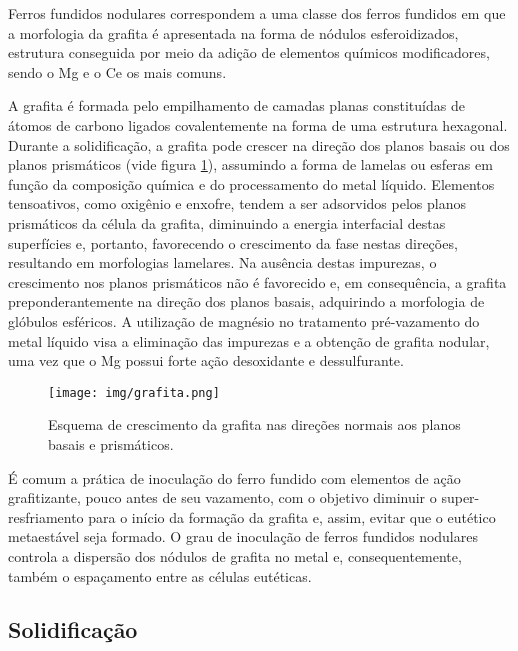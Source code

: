 Ferros fundidos nodulares correspondem a uma classe dos ferros fundidos em que a morfologia da grafita é apresentada na forma de nódulos esferoidizados, estrutura conseguida por meio da adição de elementos químicos modificadores, sendo o Mg e o Ce os mais comuns.

A grafita é formada pelo empilhamento de camadas planas constituídas de átomos de carbono ligados covalentemente na forma de uma estrutura hexagonal. Durante a solidificação, a grafita pode crescer na direção dos planos basais ou dos planos prismáticos (vide figura \ref{fig:grafita}), assumindo a forma de lamelas ou esferas em função da composição química e do processamento do metal líquido. Elementos tensoativos, como oxigênio e enxofre, tendem a ser adsorvidos pelos planos prismáticos da célula da grafita, diminuindo a energia interfacial destas superfícies e, portanto, favorecendo o crescimento da fase nestas direções, resultando em morfologias lamelares. Na ausência destas impurezas, o crescimento nos planos prismáticos não é favorecido e, em consequência, a grafita preponderantemente na direção dos planos basais, adquirindo a morfologia de glóbulos esféricos. A utilização de magnésio no tratamento pré-vazamento do metal líquido visa a eliminação das impurezas e a obtenção de grafita nodular, uma vez que o Mg possui forte ação desoxidante e dessulfurante\cite{Labrecque1998,Guesser2009}.

\begin{figure}
	\texttt{[image: img/grafita.png]}
	\caption{Esquema de crescimento da grafita nas direções normais aos planos basais e prismáticos\cite{Guesser2009}.}
	\label{fig:grafita}
\end{figure}

É comum a prática de inoculação do ferro fundido com elementos de ação grafitizante, pouco antes de seu vazamento, com o objetivo diminuir o super-resfriamento para o início da formação da grafita e, assim, evitar que o eutético metaestável seja formado\cite{Santos1991}. O grau de inoculação de ferros fundidos nodulares controla a dispersão dos nódulos de grafita no metal e, consequentemente, também o espaçamento entre as células eutéticas.

\subsection{Solidifica\c{c}\~{a}o}

